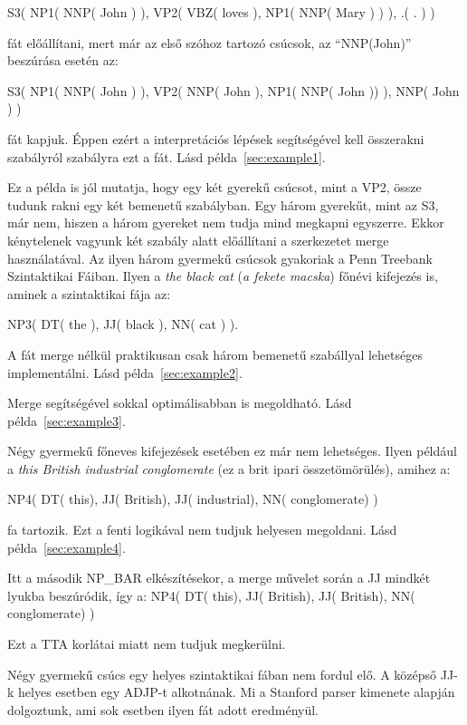 S3( NP1( NNP( John ) ), VP2( VBZ( loves ),  NP1( NNP( Mary ) ) ), .( . ) )

fát előállítani, mert már az első szóhoz tartozó csúcsok, az “NNP(John)” beszúrása esetén az:

S3( NP1( NNP( John ) ), VP2( NNP( John ),  NP1( NNP( John )) ), NNP( John ) )

fát kapjuk. 
Éppen ezért a interpretációs lépések segítségével kell összerakni szabályról szabályra ezt a fát. 
Lásd példa~\ref{sec:example1}.

Ez a példa is jól mutatja, hogy egy két gyerekű csúcsot, mint a VP2, össze tudunk rakni egy két bemenetű szabályban. Egy három gyerekűt, mint az S3, már nem, hiszen a három gyereket nem tudja mind megkapni egyszerre. Ekkor kénytelenek vagyunk két szabály alatt előállítani a szerkezetet merge használatával. Az ilyen három gyermekű csúcsok gyakoriak a Penn Treebank Szintaktikai Fáiban.  Ilyen a \textit{the black cat} (\textit{a fekete macska}) főnévi kifejezés is, aminek a szintaktikai fája az:

NP3( DT( the ), JJ( black ), NN( cat ) ).

A fát merge nélkül praktikusan csak három bemenetű szabállyal lehetséges implementálni.
Lásd példa~\ref{sec:example2}.

Merge segítségével sokkal optimálisabban is megoldható. Lásd példa~\ref{sec:example3}.

Négy gyermekű főneves kifejezések esetében ez már nem lehetséges. 
Ilyen például a \textit{this British industrial conglomerate} (ez a brit ipari összetömörülés), amihez  a:

NP4( DT( this), JJ( British), JJ( industrial), NN( conglomerate) )

fa tartozik. Ezt a fenti logikával nem tudjuk helyesen megoldani. Lásd példa~\ref{sec:example4}.

Itt a második NP\_BAR elkészítésekor, a merge művelet során a JJ  mindkét lyukba beszúródik, így a: NP4( DT( this), JJ( British), JJ( British), NN( conglomerate) )

Ezt a TTA korlátai miatt nem tudjuk megkerülni.

Négy gyermekű csúcs egy helyes szintaktikai fában nem fordul elő. A középső JJ-k helyes esetben egy ADJP-t alkotnának. Mi a Stanford parser kimenete alapján dolgoztunk, ami sok esetben ilyen fát adott eredményül.


